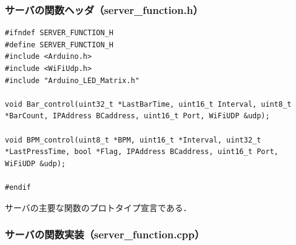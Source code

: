 \subsubsection{サーバの関数ヘッダ（server\_function.h）}

\begin{lstlisting}
#ifndef SERVER_FUNCTION_H
#define SERVER_FUNCTION_H
#include <Arduino.h>
#include <WiFiUdp.h>
#include "Arduino_LED_Matrix.h"

void Bar_control(uint32_t *LastBarTime, uint16_t Interval, uint8_t *BarCount, IPAddress BCaddress, uint16_t Port, WiFiUDP &udp);

void BPM_control(uint8_t *BPM, uint16_t *Interval, uint32_t *LastPressTime, bool *Flag, IPAddress BCaddress, uint16_t Port, WiFiUDP &udp);

#endif
\end{lstlisting}
サーバの主要な関数のプロトタイプ宣言である．
\subsubsection{サーバの関数実装（server\_function.cpp）}

